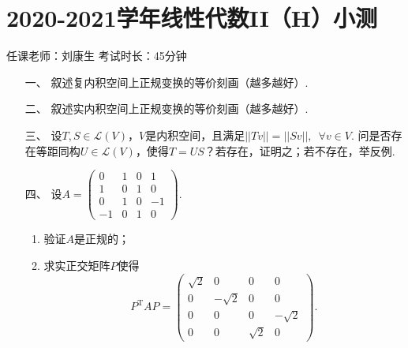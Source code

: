 \section*{2020-2021学年线性代数II（H）小测}

\begin{center}
    任课老师：刘康生\hspace{4em} 考试时长：45分钟
\end{center}

\begin{enumerate}
	\item[一、]叙述复内积空间上正规变换的等价刻画（越多越好）.
	\item[二、]叙述实内积空间上正规变换的等价刻画（越多越好）.
	\item[三、]设$T,S\in\mathcal{L}(V)$，$V$是内积空间，且满足$||Tv||=||Sv||,\enspace \forall v\in V$. 问是否存在等距同构$U\in\mathcal{L}(V)$，使得$T=US$？若存在，证明之；若不存在，举反例.
	\item[四、]设$A=\begin{pmatrix}
        0 & 1 & 0 & 1 \\ 1 & 0 & 1 & 0 \\ 0 & 1 & 0 & -1 \\ -1 & 0 & 1 & 0
    \end{pmatrix}$.
    \begin{enumerate}[label=(\arabic*)]
        \item 验证$A$是正规的；

        \item 求实正交矩阵$P$使得
        \[P^{\mathrm{T}}AP=\begin{pmatrix}
            \sqrt{2} & 0 & 0 & 0 \\ 0 & -\sqrt{2} & 0 & 0 \\ 0 & 0 & 0 & -\sqrt{2} \\ 0 & 0 & \sqrt{2} & 0
        \end{pmatrix}.\]
    \end{enumerate}
\end{enumerate}

\clearpage

